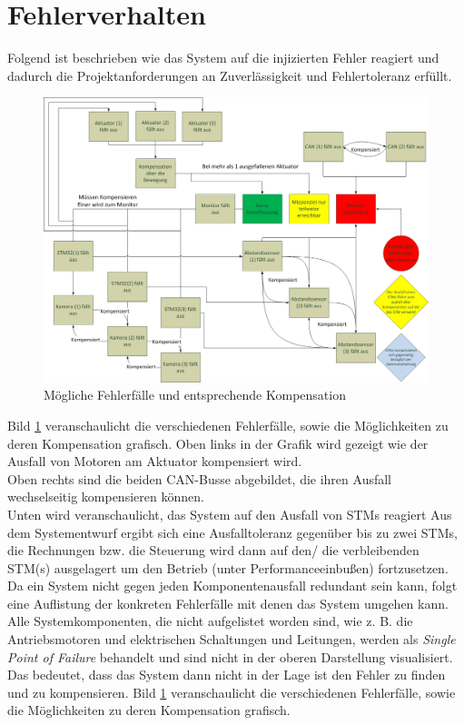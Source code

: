 \section{Fehlerverhalten}
\label{Fehlervehalten}
Folgend ist beschrieben wie das System auf die injizierten Fehler reagiert und dadurch die Projektanforderungen an Zuverlässigkeit und Fehlertoleranz erfüllt.
\begin{figure}[H]
\centering
\includegraphics[width=\linewidth]{Bilder/FaTNet_fehlerverhalten}
\caption{Mögliche Fehlerfälle und entsprechende Kompensation}
\label{fig:fehlerverhalten}
\end{figure}

Bild \ref{fig:fehlerverhalten} veranschaulicht die verschiedenen Fehlerfälle, sowie die Möglichkeiten zu deren Kompensation grafisch.
Oben links in der Grafik wird gezeigt wie der Ausfall von Motoren am  Aktuator kompensiert wird.\\
Oben rechts sind die beiden CAN-Busse abgebildet, die ihren Ausfall wechselseitig kompensieren können.\\
Unten wird veranschaulicht, das System auf den Ausfall von STMs reagiert
Aus dem Systementwurf ergibt sich eine Ausfalltoleranz gegenüber bis zu zwei STMs, die Rechnungen bzw. die Steuerung wird dann  auf den/ die verbleibenden STM(s) ausgelagert um den Betrieb (unter Performanceeinbußen) fortzusetzen.\\
Da ein System nicht gegen jeden Komponentenausfall redundant sein kann, folgt eine Auflistung der konkreten Fehlerfälle mit denen das System umgehen kann. Alle Systemkomponenten, die nicht aufgelistet worden sind, wie z. B. die Antriebsmotoren und elektrischen Schaltungen und Leitungen, werden als \textit{Single Point of Failure} behandelt und sind nicht in der oberen Darstellung visualisiert. Das bedeutet, dass das System dann nicht in der Lage ist den Fehler zu finden und zu kompensieren.
Bild \ref{fig:fehlerverhalten} veranschaulicht die verschiedenen Fehlerfälle, sowie die Möglichkeiten zu deren Kompensation grafisch.


